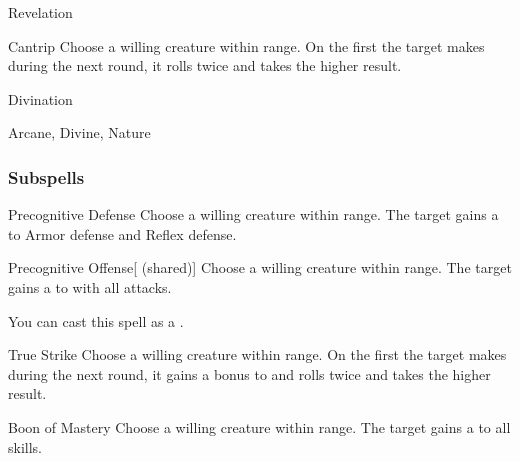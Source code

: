 \newpage
\begin{spellsection}{Revelation}

\begin{spellheader}
\end{spellheader}


\begin{ability}{Cantrip}
Choose a willing creature within \rngclose range.
On the first  the target makes during the next round, it rolls twice and takes the higher result.
\end{ability}




 Divination

 Arcane, Divine, Nature
\end{spellsection}


\subsubsection{Subspells}


\begin{ability}[\nth{1}]{Precognitive Defense}
Choose a willing creature within \rngclose range.
The target gains a   to Armor defense and Reflex defense.
\end{ability}
\vspace{0.25em}


\begin{ability}[\nth{1}]{Precognitive Offense}[ (shared)]
Choose a willing creature within \rngclose range.
The target gains a   to  with all attacks.

You can cast this spell as a .
\end{ability}
\vspace{0.25em}


\begin{ability}[\nth{1}]{True Strike}
Choose a willing creature within \rngclose range.
On the first  the target makes during the next round, it gains a  bonus to  and rolls twice and takes the higher result.
\end{ability}
\vspace{0.25em}


\begin{ability}[\nth{2}]{Boon of Mastery}
Choose a willing creature within \rngclose range.
The target gains a   to all skills.
\end{ability}
\vspace{0.25em}


